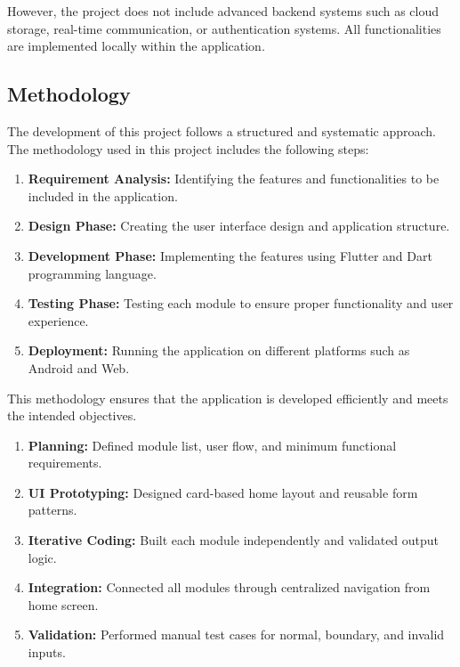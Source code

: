 \documentclass{article}
\begin{document}
However, the project does not include advanced backend systems such as cloud storage, real-time communication, or authentication systems. All functionalities are implemented locally within the application.

\subsection{Methodology}

The development of this project follows a structured and systematic approach. The methodology used in this project includes the following steps:

\begin{enumerate}
\item \textbf{Requirement Analysis:} Identifying the features and functionalities to be included in the application.
\item \textbf{Design Phase:} Creating the user interface design and application structure.
\item \textbf{Development Phase:} Implementing the features using Flutter and Dart programming language.
\item \textbf{Testing Phase:} Testing each module to ensure proper functionality and user experience.
\item \textbf{Deployment:} Running the application on different platforms such as Android and Web.
\end{enumerate}

This methodology ensures that the application is developed efficiently and meets the intended objectives.

\begin{reportbox}
\begin{enumerate}
\item \textbf{Planning:} Defined module list, user flow, and minimum functional requirements.
\item \textbf{UI Prototyping:} Designed card-based home layout and reusable form patterns.
\item \textbf{Iterative Coding:} Built each module independently and validated output logic.
\item \textbf{Integration:} Connected all modules through centralized navigation from home screen.
\item \textbf{Validation:} Performed manual test cases for normal, boundary, and invalid inputs.
\end{enumerate}
\end{reportbox}
\end{document}
